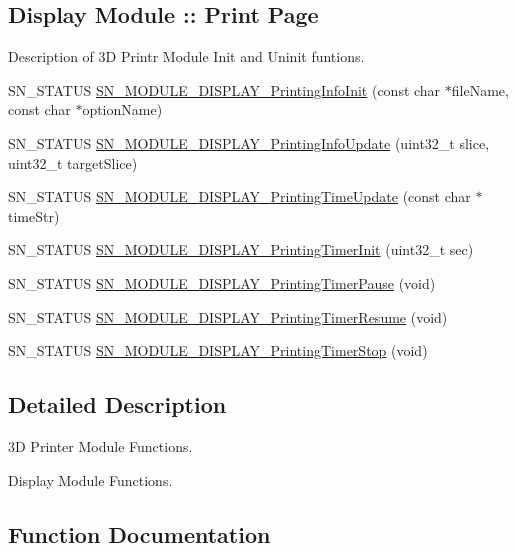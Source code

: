 \subsection*{Display Module \+:\+: Print Page}
\label{_amgrp55874ffdc44d68481ed735898ef131ed}%
Description of 3D Printr Module Init and Uninit funtions. \begin{DoxyCompactItemize}
\item 
S\+N\+\_\+\+S\+T\+A\+T\+US \hyperlink{group__Module_ga6059a98606c93e2bd4bd2ffb68486e4c}{S\+N\+\_\+\+M\+O\+D\+U\+L\+E\+\_\+\+D\+I\+S\+P\+L\+A\+Y\+\_\+\+Printing\+Info\+Init} (const char $\ast$file\+Name, const char $\ast$option\+Name)
\item 
S\+N\+\_\+\+S\+T\+A\+T\+US \hyperlink{group__Module_ga943b965a7a2e59a6c9f035c74c2c8735}{S\+N\+\_\+\+M\+O\+D\+U\+L\+E\+\_\+\+D\+I\+S\+P\+L\+A\+Y\+\_\+\+Printing\+Info\+Update} (uint32\+\_\+t slice, uint32\+\_\+t target\+Slice)
\item 
S\+N\+\_\+\+S\+T\+A\+T\+US \hyperlink{group__Module_gad7020c862f68d736701d9305e9b7e6f0}{S\+N\+\_\+\+M\+O\+D\+U\+L\+E\+\_\+\+D\+I\+S\+P\+L\+A\+Y\+\_\+\+Printing\+Time\+Update} (const char $\ast$time\+Str)
\item 
S\+N\+\_\+\+S\+T\+A\+T\+US \hyperlink{group__Module_gac630c6bd386295f3008bc04e8b9c92a0}{S\+N\+\_\+\+M\+O\+D\+U\+L\+E\+\_\+\+D\+I\+S\+P\+L\+A\+Y\+\_\+\+Printing\+Timer\+Init} (uint32\+\_\+t sec)
\item 
S\+N\+\_\+\+S\+T\+A\+T\+US \hyperlink{group__Module_ga21d62aed53ed746d4912685df22c224a}{S\+N\+\_\+\+M\+O\+D\+U\+L\+E\+\_\+\+D\+I\+S\+P\+L\+A\+Y\+\_\+\+Printing\+Timer\+Pause} (void)
\item 
S\+N\+\_\+\+S\+T\+A\+T\+US \hyperlink{group__Module_ga457dd831602b689bb557899b06e69e3c}{S\+N\+\_\+\+M\+O\+D\+U\+L\+E\+\_\+\+D\+I\+S\+P\+L\+A\+Y\+\_\+\+Printing\+Timer\+Resume} (void)
\item 
S\+N\+\_\+\+S\+T\+A\+T\+US \hyperlink{group__Module_ga23a40fbba57f5da86b6173fe40861196}{S\+N\+\_\+\+M\+O\+D\+U\+L\+E\+\_\+\+D\+I\+S\+P\+L\+A\+Y\+\_\+\+Printing\+Timer\+Stop} (void)
\end{DoxyCompactItemize}


\subsection{Detailed Description}
3D Printer Module Functions. 

Display Module Functions.

\subsection{Function Documentation}
\mbox{\label{group__Module_ga801e265ffe6f8c56081112f4fdd35f39}} 
